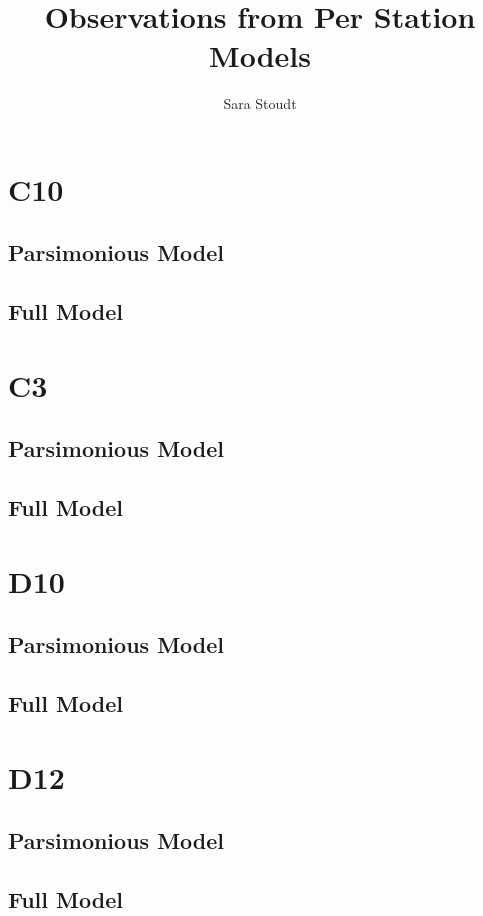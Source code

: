 \documentclass[12pt]{amsart}
\title{Observations from Per Station Models}
\author{Sara Stoudt}
\begin{document}
\maketitle

\section{C10}
\subsection{Parsimonious Model}

\subsection{Full Model}

\section{C3}
\subsection{Parsimonious Model}

\subsection{Full Model}

\section{D10}
\subsection{Parsimonious Model}

\subsection{Full Model}

\section{D12}
\subsection{Parsimonious Model}

\subsection{Full Model}
\end{document}
